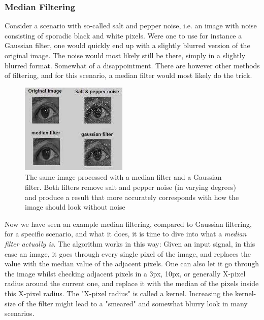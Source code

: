 \documentclass[twoside,a4paper,article]{combine}
\begin{document}
\subsubsection{Median Filtering}
Consider a scenario with so-called salt and pepper noise, i.e. an image with noise consisting of sporadic black and white pixels. Were one to use for instance a Gaussian filter, one would quickly end up with a slightly blurred version of the original image. The noise would most likely still be there, simply in a slightly blurred format. Somewhat of a disappointment. There are however other methods of filtering, and for this scenario, a median filter would most likely do the trick.

\begin{figure}[H]
    \centering
    \includegraphics[width=0.5\linewidth]{medianfiltering.jpeg}
    \caption{The same image processed with a median filter and a Gaussian filter. Both filters remove salt and pepper noise (in varying degrees) and produce a result that more accurately corresponds with how the image should look without noise}
    \label{fig:enter-label} 
\end{figure}
Now we have seen an example median filtering, compared to Gaussian filtering, for a specific scenario, and what it does, it is time to dive into what a \textit{median filter actually is}. The algorithm works in this way: Given an input signal, in this case an image, it goes through every single pixel of the image, and replaces the value with the median value of the adjacent pixels. One can also let it go through the image whilst checking adjacent pixels in a 3px, 10px, or generally X-pixel radius around the current one, and replace it with the median of the pixels inside this X-pixel radius. The "X-pixel radius" is called a kernel. Increasing the kernel-size of the filter might lead to a "smeared" and somewhat blurry look in many scenarios.
\end{document}
